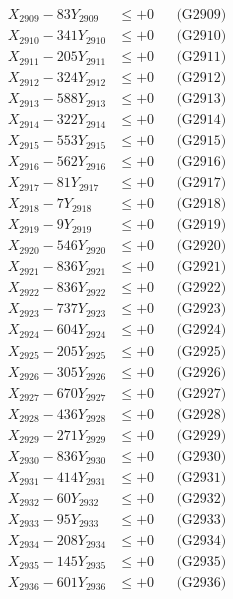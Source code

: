 \documentclass[a4paper,10pt]{article}
\begin{document}
{\begin{align}
X_{2909} - 83Y_{2909} &\leq +0 && \text{(G2909)} \\
X_{2910} - 341Y_{2910} &\leq +0 && \text{(G2910)} \\
\allowbreak
X_{2911} - 205Y_{2911} &\leq +0 && \text{(G2911)} \\
X_{2912} - 324Y_{2912} &\leq +0 && \text{(G2912)} \\
X_{2913} - 588Y_{2913} &\leq +0 && \text{(G2913)} \\
X_{2914} - 322Y_{2914} &\leq +0 && \text{(G2914)} \\
X_{2915} - 553Y_{2915} &\leq +0 && \text{(G2915)} \\
X_{2916} - 562Y_{2916} &\leq +0 && \text{(G2916)} \\
X_{2917} - 81Y_{2917} &\leq +0 && \text{(G2917)} \\
X_{2918} - 7Y_{2918} &\leq +0 && \text{(G2918)} \\
X_{2919} - 9Y_{2919} &\leq +0 && \text{(G2919)} \\
X_{2920} - 546Y_{2920} &\leq +0 && \text{(G2920)} \\
\allowbreak
X_{2921} - 836Y_{2921} &\leq +0 && \text{(G2921)} \\
X_{2922} - 836Y_{2922} &\leq +0 && \text{(G2922)} \\
X_{2923} - 737Y_{2923} &\leq +0 && \text{(G2923)} \\
X_{2924} - 604Y_{2924} &\leq +0 && \text{(G2924)} \\
X_{2925} - 205Y_{2925} &\leq +0 && \text{(G2925)} \\
X_{2926} - 305Y_{2926} &\leq +0 && \text{(G2926)} \\
X_{2927} - 670Y_{2927} &\leq +0 && \text{(G2927)} \\
X_{2928} - 436Y_{2928} &\leq +0 && \text{(G2928)} \\
X_{2929} - 271Y_{2929} &\leq +0 && \text{(G2929)} \\
X_{2930} - 836Y_{2930} &\leq +0 && \text{(G2930)} \\
\allowbreak
X_{2931} - 414Y_{2931} &\leq +0 && \text{(G2931)} \\
X_{2932} - 60Y_{2932} &\leq +0 && \text{(G2932)} \\
X_{2933} - 95Y_{2933} &\leq +0 && \text{(G2933)} \\
X_{2934} - 208Y_{2934} &\leq +0 && \text{(G2934)} \\
X_{2935} - 145Y_{2935} &\leq +0 && \text{(G2935)} \\
X_{2936} - 601Y_{2936} &\leq +0 && \text{(G2936)} \\

\end{align}}
\end{document}
